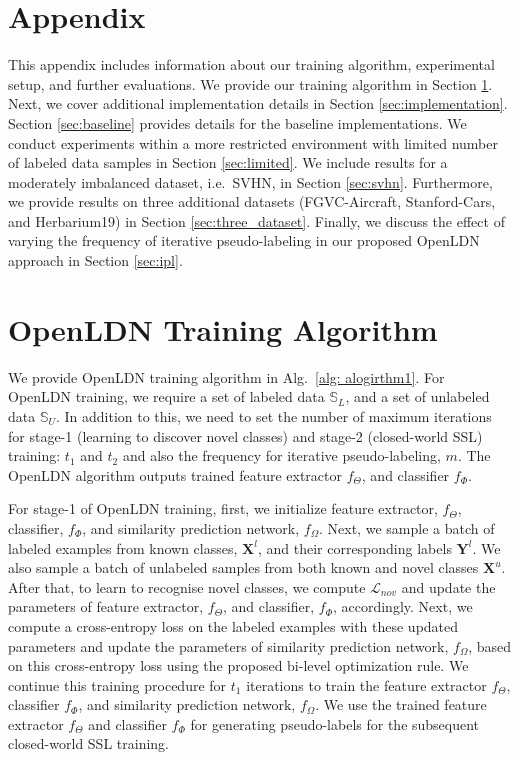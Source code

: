 \documentclass[runningheads]{eccv2022submission}
\begin{document}
\clearpage

\appendix
\section*{Appendix}
This appendix includes information about our training algorithm, experimental setup, and further evaluations. We provide our training algorithm in Section \ref{sec:algorithm}. Next, we cover additional implementation details in Section \ref{sec:implementation}. Section \ref{sec:baseline} provides details for the baseline implementations. We conduct experiments within a more restricted environment with limited number of labeled data samples in Section \ref{sec:limited}. We include results for a moderately imbalanced dataset, i.e.\ SVHN, in Section \ref{sec:svhn}. Furthermore, we provide results on three additional datasets (FGVC-Aircraft, Stanford-Cars, and Herbarium19) in Section \ref{sec:three_dataset}. Finally, we discuss the effect of varying the frequency of iterative pseudo-labeling in our proposed OpenLDN approach in Section \ref{sec:ipl}.


\section{OpenLDN Training Algorithm}
\label{sec:algorithm}
We provide OpenLDN training algorithm in Alg.~\ref{alg: alogirthm1}. For OpenLDN training, we require a set of labeled data $\mathbb{S}_L$, and a set of unlabeled data $\mathbb{S}_U$. In addition to this, we need to set the number of maximum iterations for stage-1 (learning to discover novel classes) and stage-2 (closed-world SSL) training: $t_1$ and $t_2$ and also the frequency for iterative pseudo-labeling, $m$. The OpenLDN algorithm outputs trained feature extractor $f_{\Theta}$, and classifier $f_{\Phi}$.

For stage-1 of OpenLDN training, first, we initialize feature extractor, $f_{\Theta}$, classifier, $f_{\Phi}$, and similarity prediction network, $f_{\Omega}$. Next, we sample a batch of labeled examples from known classes, $\mathbf{X}^l$, and their corresponding labels $\mathbf{Y}^l$. We also sample a batch of unlabeled samples from both known and novel classes $\mathbf{X}^u$. After that, to learn to recognise novel classes, we compute $\mathcal{L}_{nov}$ and update the parameters of feature extractor, $f_{\Theta}$, and classifier, $f_{\Phi}$, accordingly. Next, we compute a cross-entropy loss on the labeled examples with these updated parameters and update the parameters of similarity prediction network, $f_{\Omega}$, based on this cross-entropy loss using the proposed bi-level optimization rule. We continue this training procedure for $t_1$ iterations to train the feature extractor $f_{\Theta}$, classifier $f_{\Phi}$, and similarity prediction network, $f_{\Omega}$. We use the trained feature extractor $f_{\Theta}$ and classifier $f_{\Phi}$ for generating pseudo-labels for the subsequent closed-world SSL training.              
\end{document}
